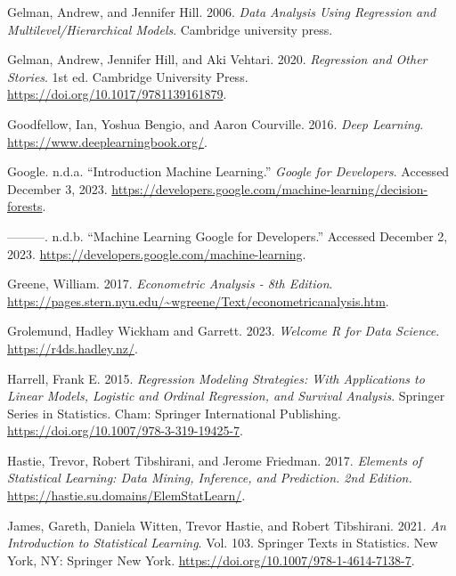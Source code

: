 \documentclass[
  letterpaper,
]{krantz}
\newlength{\cslhangindent}
\newenvironment{CSLReferences}[2] %
 {\begin{list}{}{%
  \setlength{\itemindent}{0pt}
  \setlength{\leftmargin}{0pt}
  \setlength{\parsep}{0pt}
  \ifodd #1
   \setlength{\leftmargin}{\cslhangindent}
   \setlength{\itemindent}{-1\cslhangindent}
  \fi
  \setlength{\itemsep}{#2\baselineskip}}}
 {\end{list}}
\begin{document}
\begin{CSLReferences}{1}{0}
Gelman, Andrew, and Jennifer Hill. 2006. \emph{Data Analysis Using
Regression and Multilevel/Hierarchical Models}. Cambridge university
press.

Gelman, Andrew, Jennifer Hill, and Aki Vehtari. 2020. \emph{Regression
and {Other} {Stories}}. 1st ed. Cambridge University Press.
\url{https://doi.org/10.1017/9781139161879}.

Goodfellow, Ian, Yoshua Bengio, and Aaron Courville. 2016. \emph{Deep
{Learning}}. \url{https://www.deeplearningbook.org/}.

Google. n.d.a. {``Introduction {\textbar} {Machine} {Learning}.''}
\emph{Google for Developers}. Accessed December 3, 2023.
\url{https://developers.google.com/machine-learning/decision-forests}.

---------. n.d.b. {``Machine {Learning} {\textbar} {Google} for
{Developers}.''} Accessed December 2, 2023.
\url{https://developers.google.com/machine-learning}.

Greene, William. 2017. \emph{Econometric {Analysis} - 8th {Edition}}.
\url{https://pages.stern.nyu.edu/~wgreene/Text/econometricanalysis.htm}.

Grolemund, Hadley Wickham and Garrett. 2023. \emph{Welcome {\textbar}
{R} for {Data} {Science}}. \url{https://r4ds.hadley.nz/}.

Harrell, Frank E. 2015. \emph{Regression {Modeling} {Strategies}: {With}
{Applications} to {Linear} {Models}, {Logistic} and {Ordinal}
{Regression}, and {Survival} {Analysis}}. Springer {Series} in
{Statistics}. Cham: Springer International Publishing.
\url{https://doi.org/10.1007/978-3-319-19425-7}.

Hastie, Trevor, Robert Tibshirani, and Jerome Friedman. 2017.
\emph{Elements of {Statistical} {Learning}: Data Mining, Inference, and
Prediction. 2nd {Edition}.}
\url{https://hastie.su.domains/ElemStatLearn/}.

James, Gareth, Daniela Witten, Trevor Hastie, and Robert Tibshirani.
2021. \emph{An {Introduction} to {Statistical} {Learning}}. Vol. 103.
Springer {Texts} in {Statistics}. New York, NY: Springer New York.
\url{https://doi.org/10.1007/978-1-4614-7138-7}.


\end{CSLReferences}
\end{document}
